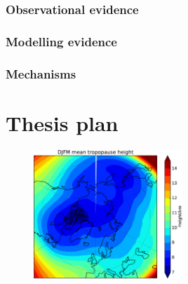 \subsubsection{Observational evidence}
\label{sec:observ-evid}
\subsubsection{Modelling evidence}
\subsubsection{Mechanisms}
\label{sec:mechanisms}


\section{Thesis plan}

\begin{figure}
 \centering
 \noindent\includegraphics[width=0.5\textwidth]{figures/chapter-intro/mean_tropopause_height.pdf}
 \caption[]{ }
 \label{fig:cmip5_mslp_diff}
\end{figure}



